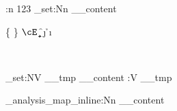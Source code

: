 \documentclass[12pt]{article}
\begin{document}
\ExplSyntaxOn
\pretty:n {123}
\tl_set:Nn \__content {
	\cB \a \cE \z
	\cB \{ \cE \}
	\cB \( \cE \)
	\cM \b
	\cT \c
	\cP \d
	\cU \e
	\cD \f
	\cS \j
	\cL \g
	\cO \h
	\cA \i \cA {\~\ }
	
	\cM \  %
	\cT \  %
	\cP \  %
	\cU \  %
	\cD \  %
	\cS \  %
	\cL \  %
	\cO \  %
}

\benchmark{--}
\precattl_set:NV \__tmp \__content
\pretty:V \__tmp


\benchmark{--}
\tl_analysis_map_inline:Nn \__content {}

\ExplSyntaxOff
\end{document}
